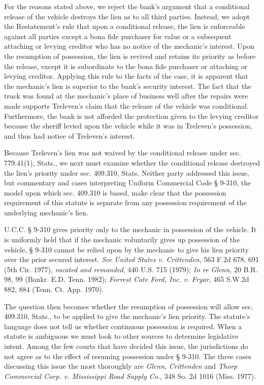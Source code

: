 For the reasons stated above, we reject the bank's argument that a conditional
release of the vehicle destroys the lien as to all third parties. Instead, we
adopt the Restatement's rule that upon a conditional release, the lien is
enforceable against all parties except a bona fide purchaser for value or a
subsequent attaching or levying creditor who has no notice of the mechanic's
interest. Upon the resumption of possession, the lien is revived and retains
its priority as before the release, except it is subordinate to the bona fide
purchaser or attaching or levying creditor. Applying this rule to the facts of
the case, it is apparent that the mechanic's lien is superior to the bank's
security interest. The fact that the truck was found at the mechanic's place of
business well after the repairs were made supports Treleven's claim that the
release of the vehicle was conditional. Furthermore, the bank is not afforded
the protection given to the levying creditor because the sheriff levied upon
the vehicle while it was in Treleven's possession, and thus had notice of
Treleven's interest.

Because Treleven's lien was not waived by the conditional release under sec.
779.41(1), Stats., we next must examine whether the conditional release
destroyed the lien's priority under sec. 409.310, Stats. Neither party
addressed this issue, but commentary and cases interpreting Uniform Commercial
Code {\S} 9-310, the model upon which sec. 409.310 is based, make clear that
the possession requirement of this statute is separate from any possession
requirement of the underlying mechanic's lien.

U.C.C. {\S} 9-310 gives priority only to the mechanic in possession of the
vehicle. It is uniformly held that if the mechanic voluntarily gives up
possession of the vehicle, {\S} 9-310 cannot be relied upon by the mechanic to
give his lien priority over the prior secured interest. \textit{See}
\textit{United States v. Crittenden}, 563 F.2d 678, 691 (5th Cir. 1977),
\textit{vacated and remanded}, 440 U.S. 715 (1979); \textit{In re Glenn}, 20
B.R. 98, 99 (Bankr. E.D. Tenn. 1982); \textit{Forrest Cate Ford, Inc. v.
Fryar}, 465 S.W.2d 882, 884 (Tenn. Ct. App. 1970).

The question then becomes whether the resumption of possession will allow sec.
409.310, Stats., to be applied to give the mechanic's lien priority. The
statute's language does not tell us whether continuous possession is required.
When a statute is ambiguous we must look to other sources to determine
legislative intent. Among the few courts that have decided this issue, the
jurisdictions do not agree as to the effect of resuming possession under {\S}
9-310. The three cases discussing this issue the most thoroughly are
\textit{Glenn}, \textit{Crittenden} and \textit{Thorp Commercial Corp. v.
Mississippi Road Supply Co.}, 348 So. 2d 1016 (Miss. 1977).


